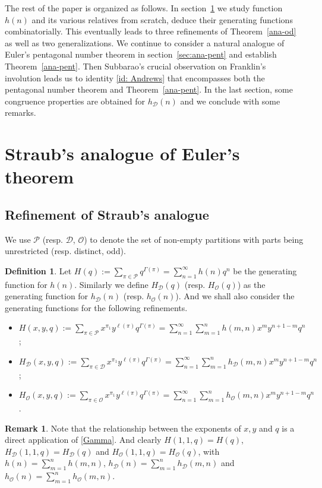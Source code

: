 \documentclass[12pt]{amsart}
\numberwithin{equation}{section}
\theoremstyle{plain}
\theoremstyle{definition}
\newtheorem{Def}[theorem]{Definition}
\newtheorem{remark}[theorem]{Remark}
\def\D{\mathcal{D}}
\def\O{\mathcal{O}}
\def\P{\mathcal{P}}
\begin{document}
The rest of the paper is organized as follows. In section~\ref{sec:ana-od} we study function $h(n)$ and its various relatives from scratch, deduce their generating functions combinatorially. This eventually leads to three refinements of Theorem~\ref{ana-od} as well as two generalizations. We continue to consider a natural analogue of Euler's pentagonal number theorem in section~\ref{sec:ana-pent} and establish Theorem~\ref{ana-pent}. Then Subbarao's crucial observation \cite{Sub} on Franklin's involution leads us to identity \eqref{id: Andrews} that encompasses both the pentagonal number theorem and Theorem~\ref{ana-pent}. In the last section, some congruence properties are obtained for $h_{\D}(n)$ and we conclude with some remarks.



\section{Straub's analogue of Euler's theorem}\label{sec:ana-od}


\subsection{Refinement of Straub's analogue}


We use $\P$ (resp. $\D$, $\O$) to denote the set of non-empty partitions with parts being unrestricted (resp. distinct, odd).
\begin{Def}
Let $H(q):=\sum_{\pi\in\P}q^{\Gamma(\pi)}=\sum_{n=1}^{\infty}h(n)q^n$ be the generating function for $h(n)$. Similarly we define $H_{\D}(q)$ (resp. $H_{\O}(q)$) as the generating function for $h_{\D}(n)$ (resp. $h_{\O}(n)$). And we shall also consider the generating functions for the following refinements.
\begin{itemize}
\item $H(x,y,q):=\sum\limits_{\pi\in\P}x^{\pi_1}y^{\ell(\pi)}q^{\Gamma(\pi)}=\sum\limits_{n=1}^{\infty}\sum\limits_{m=1}^{n}h(m,n)x^my^{n+1-m}q^n$;
\item $H_{\D}(x,y,q):=\sum\limits_{\pi\in\D}x^{\pi_1}y^{\ell(\pi)}q^{\Gamma(\pi)}=\sum\limits_{n=1}^{\infty}\sum\limits_{m=1}^{n}h_{\D}(m,n)x^my^{n+1-m}q^n$;
\item $H_{\O}(x,y,q):=\sum\limits_{\pi\in\O}x^{\pi_1}y^{\ell(\pi)}q^{\Gamma(\pi)}=\sum\limits_{n=1}^{\infty}\sum\limits_{m=1}^{n}h_{\O}(m,n)x^my^{n+1-m}q^n$.
\end{itemize}
\end{Def}
\begin{remark}
Note that the relationship between the exponents of $x,y$ and $q$ is a direct application of \eqref{Gamma}. And clearly $H(1,1,q)=H(q)$, $H_{\D}(1,1,q)=H_{\D}(q)$ and $H_{\O}(1,1,q)=H_{\O}(q)$, with $h(n)=\sum_{m=1}^{n}h(m,n)$, $h_{\D}(n)=\sum_{m=1}^{n}h_{\D}(m,n)$ and $h_{\O}(n)=\sum_{m=1}^{n}h_{\O}(m,n)$.
\end{remark}
\end{document}
